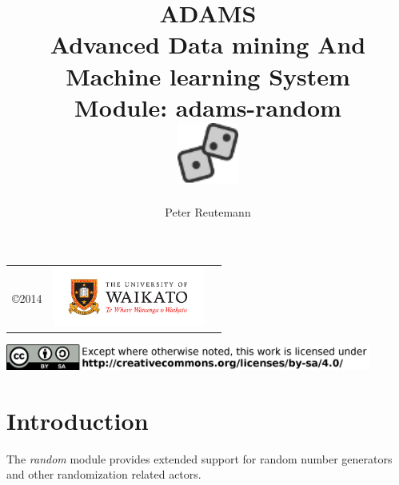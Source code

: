 \documentclass[a4paper]{book}
\title{
  \textbf{ADAMS} \\
  {\Large \textbf{A}dvanced \textbf{D}ata mining \textbf{A}nd \textbf{M}achine
  learning \textbf{S}ystem} \\
  {\Large Module: adams-random} \\
  \vspace{1cm}
  \includegraphics[width=2cm]{images/random-module.png} \\
}
\author{
  Peter Reutemann
}
\begin{document}
\begin{titlepage}
\maketitle

\thispagestyle{empty}
\center
\begin{table}[b]
	\begin{tabular}{c l l}
		\parbox[c][2cm]{2cm}{\copyright 2014} &
		\parbox[c][2cm]{5cm}{\includegraphics[width=5cm]{images/coat_of_arms.pdf}} \\
	\end{tabular}
	\includegraphics[width=12cm]{images/cc.png} \\
\end{table}

\end{titlepage}

\tableofcontents

\chapter{Introduction}
The \textit{random} module provides extended support for random number 
generators and other randomization related actors.

\end{document}
